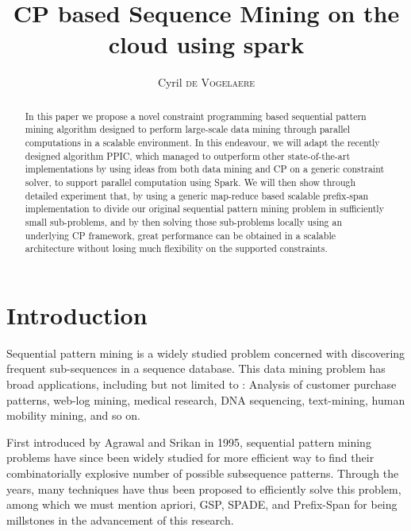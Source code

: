 \documentclass{eplmastersthesis}
\title{CP based Sequence Mining on the cloud using spark}	%
\author{Cyril \textsc{de Vogelaere}}	%
\begin{document}
\begin{singlespacing}
\maketitle					%
\end{singlespacing}

\tableofcontents
\newpage
\listoffigures
\listoftables
\newpage
\listofalgorithms
\newpage

\begin{abstract}
In this paper we propose a novel constraint programming based sequential pattern mining algorithm designed to perform large-scale data mining through parallel computations in a scalable environment. In this endeavour, we will adapt the recently designed algorithm PPIC, which managed to outperform other state-of-the-art implementations by using ideas from both data mining and CP on a generic constraint solver, to support parallel computation using Spark. We will then show through detailed experiment that, by using a generic map-reduce based scalable prefix-span implementation to divide our original sequential pattern mining problem in sufficiently small sub-problems, and by then solving those sub-problems locally using an underlying CP framework, great performance can be obtained in a scalable architecture without losing much flexibility on the supported constraints. 
\end{abstract}


\section{Introduction}

Sequential pattern mining is a widely studied problem concerned with discovering frequent sub-sequences in a sequence database. This data mining problem has broad applications, including but not limited to : Analysis of customer purchase patterns, web-log mining, medical research, DNA sequencing, text-mining, human mobility mining, and so on\cite{mabroukeh2010taxonomy}. \newline

First introduced by Agrawal and Srikan \cite{agrawal1995mining} in 1995, sequential pattern mining problems have since been widely studied for more efficient way to find their combinatorially explosive number of possible subsequence patterns. Through the years, many techniques have thus been proposed to efficiently solve this problem, among which we must mention apriori, GSP, SPADE, and Prefix-Span \cite{agrawal1995mining, srikant1996mining, han2001prefixspan, zaki2001spade} for being millstones in the advancement of this research. \newline
\end{document}
